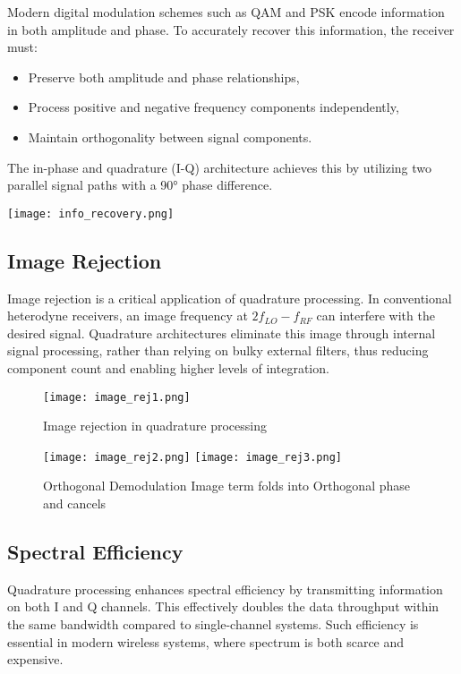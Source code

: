 \documentclass[conference]{IEEEtran}
\begin{document}
Modern digital modulation schemes such as QAM and PSK encode information in both amplitude and phase. To accurately recover this information, the receiver must:

\begin{itemize}
    \item Preserve both amplitude and phase relationships,
    \item Process positive and negative frequency components independently,
    \item Maintain orthogonality between signal components.
\end{itemize}

The in-phase and quadrature (I-Q) architecture achieves this by utilizing two parallel signal paths with a 90° phase difference.

\texttt{[image: info\_recovery.png]}

\subsection{Image Rejection}

Image rejection is a critical application of quadrature processing. In conventional heterodyne receivers, an image frequency at \( 2f_{LO} - f_{RF} \) can interfere with the desired signal. Quadrature architectures eliminate this image through internal signal processing, rather than relying on bulky external filters, thus reducing component count and enabling higher levels of integration.

\begin{figure}[H]
\centering
\texttt{[image: image\_rej1.png]}
\caption{Image rejection in quadrature processing}
\end{figure}

\begin{figure}[h]
\centering
\texttt{[image: image\_rej2.png]}
\texttt{[image: image\_rej3.png]}
\caption{Orthogonal Demodulation Image term folds into Orthogonal phase and cancels}
\end{figure}

\subsection{Spectral Efficiency}

Quadrature processing enhances spectral efficiency by transmitting information on both I and Q channels. This effectively doubles the data throughput within the same bandwidth compared to single-channel systems. Such efficiency is essential in modern wireless systems, where spectrum is both scarce and expensive.
\end{document}
